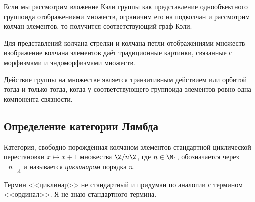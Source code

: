 \documentclass[
	extrafontsizes,
	11pt,
	hyphens,
]{memoir}
\begin{document}
\begin{example}
Если мы рассмотрим вложение Кэли группы как представление однообъектного группоида отображениями множеств, ограничим его на подколчан и рассмотрим колчан элементов, то получится соответствующий граф Кэли.
\end{example}

\begin{example}
Для представлений колчана-стрелки и колчана-петли отображениями множеств изображение колчана элементов даёт традиционные картинки, связанные с морфизмами и эндоморфизмами множеств.
\end{example}


\begin{example}%
Действие группы на множестве является {транзитивным действием} или {орбитой}
тогда и только тогда, когда у соответствующего группоида элементов ровно одна компонента связности.
\end{example}

\subsection{Определение категории Лямбда}

\begin{definition}%
[\scshape Циклинар]
Категория, свободно порождённая колчаном элементов стандартной циклической перестановки
\(x \mapsto x+1\) множества \(\Z/n\Z\),
где \(n \in \N_1\), обозначается через \([n]_\Lambda\) и называется
\emph{циклинаром}
порядка \(n\).
\end{definition}


\begin{remark}
Термин <<циклинар>> не стандартный и придуман по аналогии с термином <<ординал>>. Я не знаю стандартного термина.
\end{remark}
\end{document}
